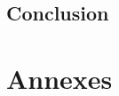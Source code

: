 \documentclass[11pt,a4paper,twoside]{book}
\begin{document}

%


		








\chapter*{Conclusion}\label{chapter:concl}

\part*{Annexes}
\appendix
\renewcommand{\chaptermark}[1]{\markboth{\appendixname\ \thechapter: #1}{}}

\renewcommand{\bibname}{References}
\printbibliography

\backmatter
\end{document}

